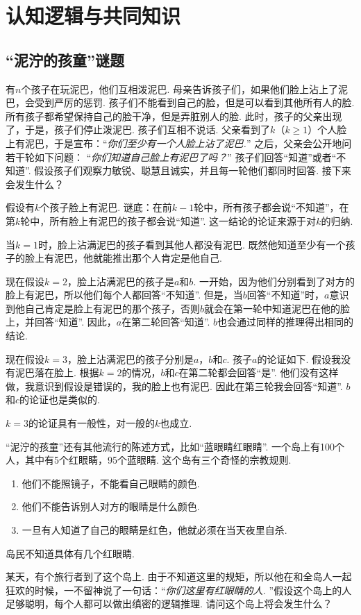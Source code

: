 \chapter{认知逻辑与共同知识}\label{chap:epistemic-logic}

\section{“泥泞的孩童”谜题}
有$n$个孩子在玩泥巴，他们互相泼泥巴. 母亲告诉孩子们，如果他们脸上沾上了泥巴，会受到严厉的惩罚. 孩子们不能看到自己的脸，但是可以看到其他所有人的脸. 所有孩子都希望保持自己的脸干净，但是弄脏别人的脸. 此时，孩子的父亲出现了，于是，孩子们停止泼泥巴. 孩子们互相不说话. 父亲看到了$k$（$k\geq 1$）个人脸上有泥巴，于是宣布：“\emph{你们至少有一个人脸上沾了泥巴.}” 之后，父亲会公开地问若干轮如下问题： “\emph{你们知道自己脸上有泥巴了吗？}” 孩子们回答“知道”或者“不知道”. 假设孩子们观察力敏锐、聪慧且诚实，并且每一轮他们都同时回答. 接下来会发生什么？

假设有$k$个孩子脸上有泥巴. 谜底：在前$k-1$轮中，所有孩子都会说“不知道”，在第$k$轮中，所有脸上有泥巴的孩子都会说“知道”. 这一结论的论证来源于对$k$的归纳.

当$k=1$时，脸上沾满泥巴的孩子看到其他人都没有泥巴. 既然他知道至少有一个孩子的脸上有泥巴，他就能推出那个人肯定是他自己. 

现在假设$k=2$，脸上沾满泥巴的孩子是$a$和$b$. 一开始，因为他们分别看到了对方的脸上有泥巴，所以他们每个人都回答“不知道”. 但是，当$b$回答“不知道”时，$a$意识到他自己肯定是脸上有泥巴的那个孩子，否则$b$就会在第一轮中知道泥巴在他的脸上，并回答“知道”. 因此，$a$在第二轮回答“知道”. $b$也会通过同样的推理得出相同的结论. 

 现在假设$k=3$，脸上沾满泥巴的孩子分别是$a$，$b$和$c$. 孩子$a$的论证如下. 假设我没有泥巴落在脸上. 根据$k=2$的情况，$b$和$c$在第二轮都会回答“是”. 他们没有这样做，我意识到假设是错误的，我的脸上也有泥巴. 因此在第三轮我会回答“知道”. $b$和$c$的论证也是类似的.

$k=3$的论证具有一般性，对一般的$k$也成立.

\begin{remark}
“泥泞的孩童”还有其他流行的陈述方式，比如“蓝眼睛红眼睛”. 一个岛上有100个人，其中有5个红眼睛，95个蓝眼睛. 这个岛有三个奇怪的宗教规则.
    \begin{enumerate}
        \item 他们不能照镜子，不能看自己眼睛的颜色. 
        \item 他们不能告诉别人对方的眼睛是什么颜色. 
        \item 一旦有人知道了自己的眼睛是红色，他就必须在当天夜里自杀.
    \end{enumerate}
岛民不知道具体有几个红眼睛. 

某天，有个旅行者到了这个岛上. 由于不知道这里的规矩，所以他在和全岛人一起狂欢的时候，一不留神说了一句话：“\emph{你们这里有红眼睛的人. }”假设这个岛上的人足够聪明，每个人都可以做出缜密的逻辑推理. 请问这个岛上将会发生什么？
\end{remark}

